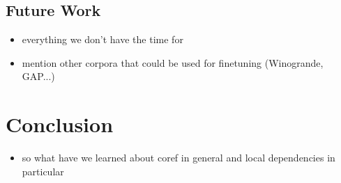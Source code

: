 \documentclass[11pt]{article}
\begin{document}
\subsection{Future Work}
\begin{itemize}
\item everything we don't have the time for
\item mention other corpora that could be used for finetuning (Winogrande, GAP...)

\end{itemize}

\section{Conclusion}

\begin{itemize}
\item so what have we learned about coref in general and local dependencies in particular
\end{itemize}

\printbibliography
\end{document}
